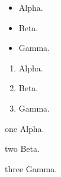 \begin{itemize}
\item Alpha.
\item Beta.
\item Gamma.
\end{itemize}

\begin{enumerate}
\item Alpha.
\item Beta.
\item Gamma.
\end{enumerate}

\begin{description}
\item{one} Alpha.
\item{two} Beta.
\item{three} Gamma.
\end{description}

